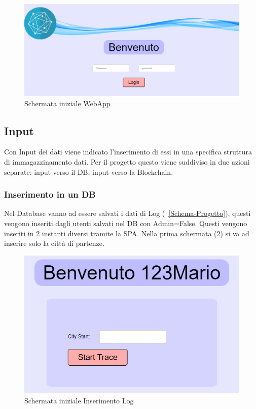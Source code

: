 \documentclass[11pt,a4paper,titlepage,twoside,openright]{report}
\begin{document}
\begin{figure}[h]
	\includegraphics[width=\textwidth]{HomePage}
	\centering
	\caption{Schermata iniziale WebApp}
	\label{fig:HomePage}
\end{figure}

\subsection{Input}
Con Input dei dati viene indicato l'inserimento di essi in una specifica struttura di immagazzinamento dati. Per il progetto questo viene suddiviso in due azioni separate: input verso il DB, input verso la Blockchain.
\subsubsection{Inserimento in un DB}
Nel Database vanno ad essere salvati i dati di Log (~\ref{Schema-Progetto}), questi vengono inseriti dagli utenti salvati nel DB con Admin=False. Questi vengono inseriti in 2 instanti diversi tramite la SPA.
Nella prima schermata (\ref{fig:Init_Log}) si va ad inserire solo la città di partenze.
\begin{figure}[h]
	\includegraphics[width=\textwidth]{Init_Log}
	\centering
	\caption{Schermata iniziale Inserimento Log}
	\label{fig:Init_Log}
\end{figure}
\end{document}

